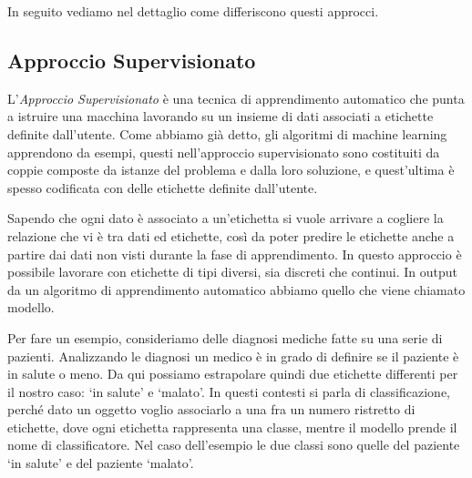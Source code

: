 \documentclass[a4paper,12pt]{report}
\begin{document}
\noindent In seguito vediamo nel dettaglio come differiscono questi approcci.

\subsection*{Approccio Supervisionato}
L'\textit{Approccio Supervisionato} \cite{machine_learning_oreilly}\cite{unsupervised_learning} è una tecnica di apprendimento automatico che punta a istruire una macchina lavorando su un insieme di dati associati a etichette definite dall'utente.
Come abbiamo già detto, gli algoritmi di machine learning apprendono da esempi, questi nell'approccio supervisionato sono costituiti da coppie composte da istanze del problema e dalla loro soluzione, e quest'ultima è spesso codificata con delle etichette definite dall'utente. 

Sapendo che ogni dato è associato a un'etichetta si vuole arrivare a cogliere la relazione che vi è tra dati ed etichette, così da poter predire le etichette anche a partire dai dati non visti durante la fase di apprendimento. 
In questo approccio è possibile lavorare con etichette di tipi diversi, sia discreti che continui.
In output da un algoritmo di apprendimento automatico abbiamo quello che viene chiamato modello. 



Per fare un esempio, consideriamo delle diagnosi mediche fatte su una serie  di pazienti. 
Analizzando le diagnosi un medico è in grado di definire se il paziente è in salute o meno. Da qui possiamo estrapolare quindi due etichette differenti per il nostro caso: `in salute' e `malato'. 
In questi contesti si parla di classificazione, perché dato un oggetto voglio associarlo a una fra un numero ristretto di etichette, dove ogni etichetta rappresenta una classe, mentre il modello prende il nome di classificatore. Nel caso dell'esempio le due classi sono quelle del paziente `in salute' e del paziente `malato'. 
\end{document}
